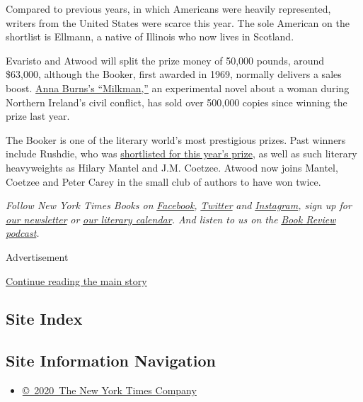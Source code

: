 Compared to previous years, in which Americans were heavily represented,
writers from the United States were scarce this year. The sole American
on the shortlist is Ellmann, a native of Illinois who now lives in
Scotland.

Evaristo and Atwood will split the prize money of 50,000 pounds, around
\$63,000, although the Booker, first awarded in 1969, normally delivers
a sales boost.
\href{https://www.nytimes.com/2018/11/29/books/anna-burns-interview-booker-prize-milkman-no-bones.html?searchResultPosition=5}{Anna
Burns's ``Milkman,''} an experimental novel about a woman during
Northern Ireland's civil conflict, has sold over 500,000 copies since
winning the prize last year.

The Booker is one of the literary world's most prestigious prizes. Past
winners include Rushdie, who was
\href{https://www.nytimes.com/2019/09/03/books/booker-prize-shortlist.html}{shortlisted
for this year's prize}, as well as such literary heavyweights as Hilary
Mantel and J.M. Coetzee. Atwood now joins Mantel, Coetzee and Peter
Carey in the small club of authors to have won twice.

\emph{Follow New York Times Books on}
\href{https://www.facebook.com/nytbooks/}{\emph{Facebook}}\emph{,}
\href{https://twitter.com/nytimesbooks}{\emph{Twitter}} \emph{and}
\href{https://www.instagram.com/nytbooks/}{\emph{Instagram}}\emph{, sign
up for}
\href{https://www.nytimes.com/newsletters/books-review}{\emph{our
newsletter}} \emph{or}
\href{https://www.nytimes.com/interactive/2017/books/books-calendar.html}{\emph{our
literary calendar}}\emph{. And listen to us on the}
\href{https://www.nytimes.com/column/book-review-podcast}{\emph{Book
Review podcast}}\emph{.}

Advertisement

\protect\hyperlink{after-bottom}{Continue reading the main story}

\hypertarget{site-index}{%
\subsection{Site Index}\label{site-index}}

\hypertarget{site-information-navigation}{%
\subsection{Site Information
Navigation}\label{site-information-navigation}}

\begin{itemize}
\tightlist
\item
  \href{https://help.nytimes.com/hc/en-us/articles/115014792127-Copyright-notice}{©~2020~The
  New York Times Company}
\end{itemize}

